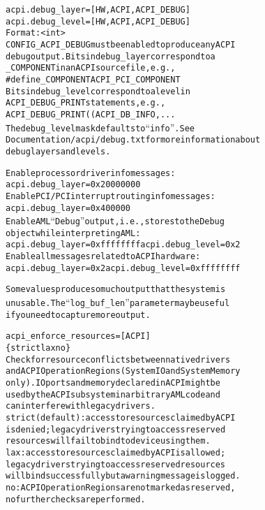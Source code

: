 \documentclass[a4paper,8pt,english]{sphinxmanual}
\begin{document}
\begin{alltt}
        acpi.debug\_layer=       {[}HW,ACPI,ACPI\_DEBUG{]}
        acpi.debug\_level=       {[}HW,ACPI,ACPI\_DEBUG{]}
                        Format: \textless{}int\textgreater{}
                        CONFIG\_ACPI\_DEBUG must be enabled to produce any ACPI
                        debug output.  Bits in debug\_layer correspond to a
                        \_COMPONENT in an ACPI source file, e.g.,
                            \#define \_COMPONENT ACPI\_PCI\_COMPONENT
                        Bits in debug\_level correspond to a level in
                        ACPI\_DEBUG\_PRINT statements, e.g.,
                            ACPI\_DEBUG\_PRINT((ACPI\_DB\_INFO, ...
                        The debug\_level mask defaults to ``info''.  See
                        Documentation/acpi/debug.txt for more information about
                        debug layers and levels.

                        Enable processor driver info messages:
                            acpi.debug\_layer=0x20000000
                        Enable PCI/PCI interrupt routing info messages:
                            acpi.debug\_layer=0x400000
                        Enable AML ``Debug'' output, i.e., stores to the Debug
                        object while interpreting AML:
                            acpi.debug\_layer=0xffffffff acpi.debug\_level=0x2
                        Enable all messages related to ACPI hardware:
                            acpi.debug\_layer=0x2 acpi.debug\_level=0xffffffff

                        Some values produce so much output that the system is
                        unusable.  The ``log\_buf\_len'' parameter may be useful
                        if you need to capture more output.

        acpi\_enforce\_resources= {[}ACPI{]}
                        \{ strict \textbar{} lax \textbar{} no \}
                        Check for resource conflicts between native drivers
                        and ACPI OperationRegions (SystemIO and SystemMemory
                        only). IO ports and memory declared in ACPI might be
                        used by the ACPI subsystem in arbitrary AML code and
                        can interfere with legacy drivers.
                        strict (default): access to resources claimed by ACPI
                        is denied; legacy drivers trying to access reserved
                        resources will fail to bind to device using them.
                        lax: access to resources claimed by ACPI is allowed;
                        legacy drivers trying to access reserved resources
                        will bind successfully but a warning message is logged.
                        no: ACPI OperationRegions are not marked as reserved,
                        no further checks are performed.


\end{alltt}
\end{document}
